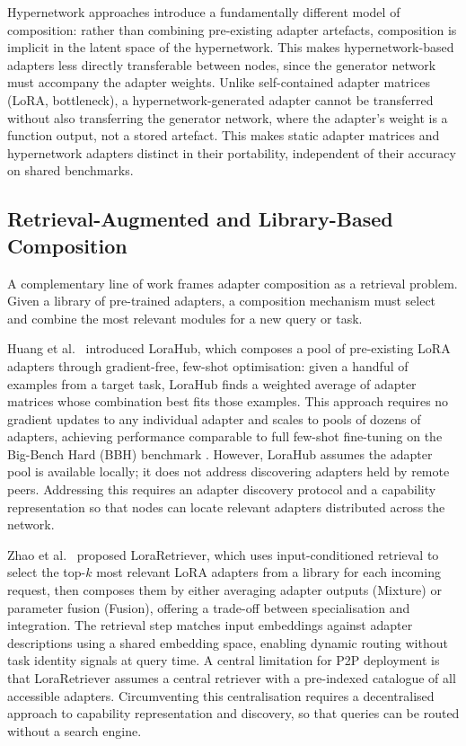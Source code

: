 Hypernetwork approaches introduce a fundamentally different model of composition:
rather than combining pre-existing adapter artefacts, composition is implicit in the
latent space of the hypernetwork. This makes hypernetwork-based adapters less directly
transferable between nodes, since the generator network must accompany the adapter
weights. Unlike self-contained adapter matrices (LoRA, bottleneck), a hypernetwork-generated
adapter cannot be transferred without also transferring the generator network, where the adapter's weight is a function output, not a stored artefact. This makes static
adapter matrices and hypernetwork adapters distinct in their portability, independent
of their accuracy on shared benchmarks.

\subsection{Retrieval-Augmented and Library-Based Composition}
\label{sec:adapter_composition:library}

A complementary line of work frames adapter composition as a retrieval problem. Given a
library of pre-trained adapters, a composition mechanism must select and combine the most
relevant modules for a new query or task.

Huang et al.~\cite{Huang2023} introduced LoraHub, which composes a pool of pre-existing LoRA adapters
through gradient-free, few-shot optimisation: given a handful of examples from a target
task, LoraHub finds a weighted average of adapter matrices whose combination best fits
those examples. This approach requires no gradient updates to any individual adapter and
scales to pools of dozens of adapters, achieving performance comparable to full few-shot
fine-tuning on the Big-Bench Hard (BBH) benchmark \cite{Huang2023}. However, LoraHub
assumes the adapter pool is available locally; it does not address discovering adapters
held by remote peers. Addressing this requires an adapter discovery protocol and a capability representation so that nodes can locate relevant adapters
distributed across the network.

Zhao et al.~\cite{ZhaoLoraRetriever2024} proposed LoraRetriever, which uses input-conditioned
retrieval to select the top-$k$ most relevant LoRA adapters from a library for each
incoming request, then composes them by either averaging adapter outputs (Mixture) or
parameter fusion (Fusion), offering a trade-off between specialisation and integration. The retrieval
step matches input embeddings against adapter descriptions using a shared embedding
space, enabling dynamic routing without task identity signals at query time. A central
limitation for P2P deployment is that LoraRetriever assumes a central retriever with a
pre-indexed catalogue of all accessible adapters. Circumventing this centralisation
requires a decentralised approach to capability representation and
discovery, so that queries can be routed without a search engine.

